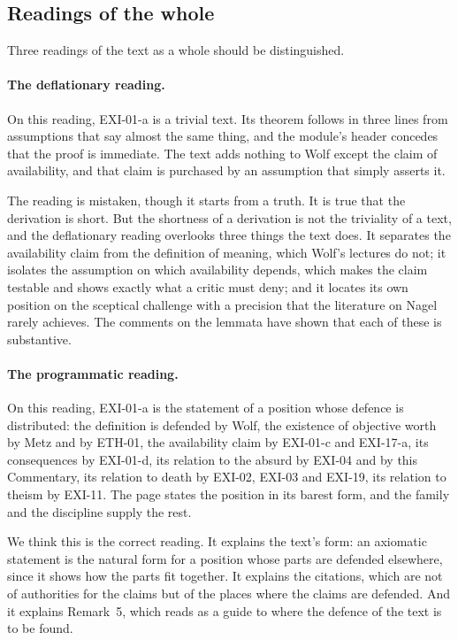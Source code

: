 \subsection{Readings of the whole}

Three readings of the text as a whole should be distinguished.

\paragraph{The deflationary reading.} On this reading, EXI-01-a is a trivial text. Its theorem follows in three lines from assumptions that say almost the same thing, and the module's header concedes that the proof is immediate. The text adds nothing to Wolf except the claim of availability, and that claim is purchased by an assumption that simply asserts it.

The reading is mistaken, though it starts from a truth. It is true that the derivation is short. But the shortness of a derivation is not the triviality of a text, and the deflationary reading overlooks three things the text does. It separates the availability claim from the definition of meaning, which Wolf's lectures do not; it isolates the assumption on which availability depends, which makes the claim testable and shows exactly what a critic must deny; and it locates its own position on the sceptical challenge with a precision that the literature on Nagel rarely achieves. The comments on the lemmata have shown that each of these is substantive.

\paragraph{The programmatic reading.} On this reading, EXI-01-a is the statement of a position whose defence is distributed: the definition is defended by Wolf, the existence of objective worth by Metz and by ETH-01, the availability claim by EXI-01-c and EXI-17-a, its consequences by EXI-01-d, its relation to the absurd by EXI-04 and by this Commentary, its relation to death by EXI-02, EXI-03 and EXI-19, its relation to theism by EXI-11. The page states the position in its barest form, and the family and the discipline supply the rest.

We think this is the correct reading. It explains the text's form: an axiomatic statement is the natural form for a position whose parts are defended elsewhere, since it shows how the parts fit together. It explains the citations, which are not of authorities for the claims but of the places where the claims are defended. And it explains Remark~5, which reads as a guide to where the defence of the text is to be found.

